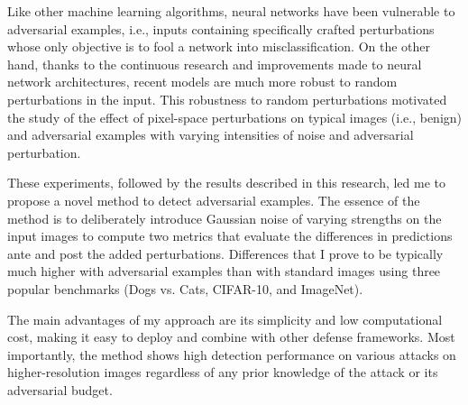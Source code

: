\begin{enabstract}
	\large
	Like other machine learning algorithms, neural networks have been vulnerable
	to adversarial examples, i.e., inputs containing specifically crafted
	perturbations whose only objective is to fool a network into
	misclassification. On the other hand, thanks to the continuous research and
	improvements made to neural network architectures, recent models are much
	more robust to random perturbations in the input. This robustness to random
	perturbations motivated the study of the effect of pixel-space perturbations
	on typical images (i.e., benign) and adversarial examples with varying
	intensities of noise and adversarial perturbation.

	These experiments, followed by the results described in this research, led
	me to propose a novel method to detect adversarial examples. The essence of
	the method is to deliberately introduce Gaussian noise of varying strengths
	on the input images to compute two metrics that evaluate the differences in
	predictions ante and post the added perturbations. Differences that I prove
	to be typically much higher with adversarial examples than with standard
	images using three popular benchmarks (Dogs vs. Cats, CIFAR-10, and
	ImageNet).

	The main advantages of my approach are its simplicity and low computational
	cost, making it easy to deploy and combine with other defense frameworks.
	Most importantly, the method shows high detection performance on various
	attacks on higher-resolution images regardless of any prior knowledge of the
	attack or its adversarial budget.
\end{enabstract}
\afterpage{\blankpage}
